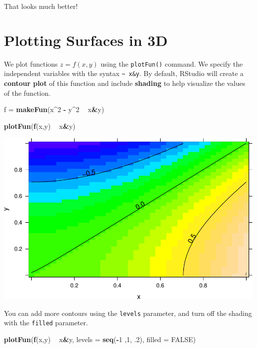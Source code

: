 \documentclass[
]{book}
\newenvironment{Shaded}{\begin{snugshade}}{\end{snugshade}}
\newcommand{\DataTypeTok}[1]{\textcolor[rgb]{0.13,0.29,0.53}{#1}}
\newcommand{\DecValTok}[1]{\textcolor[rgb]{0.00,0.00,0.81}{#1}}
\newcommand{\FloatTok}[1]{\textcolor[rgb]{0.00,0.00,0.81}{#1}}
\newcommand{\KeywordTok}[1]{\textcolor[rgb]{0.13,0.29,0.53}{\textbf{#1}}}
\newcommand{\NormalTok}[1]{#1}
\newcommand{\OperatorTok}[1]{\textcolor[rgb]{0.81,0.36,0.00}{\textbf{#1}}}
\newcommand{\OtherTok}[1]{\textcolor[rgb]{0.56,0.35,0.01}{#1}}
\newcommand{\StringTok}[1]{\textcolor[rgb]{0.31,0.60,0.02}{#1}}
\begin{document}
That looks much better!

\hypertarget{plotting-surfaces-in-3d}{%
\section{Plotting Surfaces in 3D}\label{plotting-surfaces-in-3d}}

We plot functions \(z = f(x,y)\) using the \texttt{plotFun()} command. We specify the independent variables with the syntax \texttt{\textasciitilde{}\ x\&y}. By default, RStudio will create a \textbf{contour plot} of this function and include \textbf{shading} to help visualize the values of the function.

\begin{Shaded}
\begin{Highlighting}[]
\NormalTok{f =}\StringTok{ }\KeywordTok{makeFun}\NormalTok{(x}\OperatorTok{^}\DecValTok{2} \OperatorTok{-}\StringTok{ }\NormalTok{y}\OperatorTok{^}\DecValTok{2} \OperatorTok{~}\StringTok{ }\NormalTok{x}\OperatorTok{&}\NormalTok{y)}

\KeywordTok{plotFun}\NormalTok{(}\KeywordTok{f}\NormalTok{(x,y) }\OperatorTok{~}\StringTok{ }\NormalTok{x}\OperatorTok{&}\NormalTok{y)}
\end{Highlighting}
\end{Shaded}

\includegraphics{_bookdown_files/math135_handbook_files/figure-latex/unnamed-chunk-43-1.pdf}

You can add more contours using the \texttt{levels} parameter, and turn off the shading with the \texttt{filled} parameter.

\begin{Shaded}
\begin{Highlighting}[]
\KeywordTok{plotFun}\NormalTok{(}\KeywordTok{f}\NormalTok{(x,y) }\OperatorTok{~}\StringTok{ }\NormalTok{x}\OperatorTok{&}\NormalTok{y, }\DataTypeTok{levels =} \KeywordTok{seq}\NormalTok{(}\OperatorTok{-}\DecValTok{1}\NormalTok{ ,}\DecValTok{1}\NormalTok{, }\FloatTok{.2}\NormalTok{), }\DataTypeTok{filled =} \OtherTok{FALSE}\NormalTok{)}
\end{Highlighting}
\end{Shaded}
\end{document}

